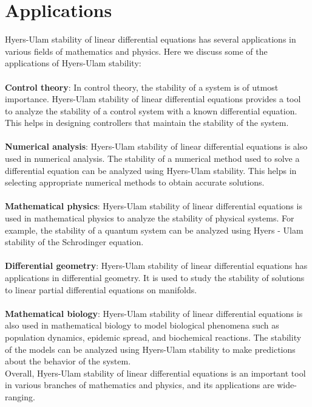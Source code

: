 \documentclass[a4paper,12pt]{report}
\begin{document}
\chapter{Applications}
Hyers-Ulam stability of linear differential equations has several \linebreak applications in various fields of mathematics and physics. Here we discuss some of the applications of Hyers-Ulam stability:\\\\
\textbf{Control theory}: In control theory, the stability of a system is of utmost importance. Hyers-Ulam stability of linear differential \linebreak equations provides a tool to analyze the stability of a control \linebreak system with a known differential equation. This helps in designing \linebreak controllers that maintain the stability of the system.\\\\
\textbf{Numerical analysis}: Hyers-Ulam stability of linear differential \linebreak equations is also used in numerical analysis. The stability of a \linebreak numerical method used to solve a differential equation can be \linebreak analyzed using Hyers-Ulam stability. This helps in selecting \linebreak appropriate numerical methods to obtain accurate solutions.\\\\
\textbf{Mathematical physics}: Hyers-Ulam stability of linear differential equations is used in mathematical physics to analyze the stability of physical systems. For example, the stability of a quantum system \linebreak can be analyzed using Hyers - Ulam stability of the Schrodinger \linebreak equation.
\\\\
\textbf{Differential geometry}: Hyers-Ulam stability of linear differential \linebreak equations has applications in differential geometry. It is used to study the stability of solutions to linear partial differential equations on manifolds.
\\\\
\textbf{Mathematical biology}: Hyers-Ulam stability of linear differential \linebreak equations is also used in mathematical biology to model biological \linebreak phenomena such as population dynamics, epidemic spread, and  \linebreak biochemical reactions. The stability of the models can be analyzed using Hyers-Ulam stability to make predictions about the behavior of the system.\\
Overall, Hyers-Ulam stability of linear differential equations is an important tool in various branches of mathematics and physics, and its applications are wide-ranging.
\pagebreak
\end{document}
